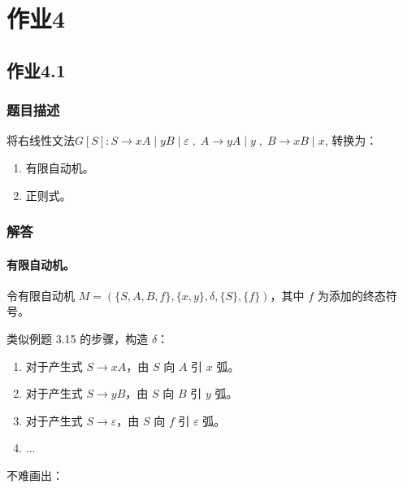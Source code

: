 
\section{作业4}
\subsection{作业4.1}
\subsubsection{题目描述}

将右线性文法$G[S]: S \rightarrow xA\;|\;yB\;|\;\varepsilon\;,\;A \rightarrow yA\;|\;y\;,\;B \rightarrow xB\;|\;x$, 转换为：
\begin{enumerate}
    \item 有限自动机。
    \item 正则式。
\end{enumerate}

\subsubsection{解答}

\paragraph{有限自动机。} 令有限自动机 $M=\left(\{S,A,B,f\},\{x,y\},\delta,\{S\},\{f\}\right)$，其中 $f$ 为添加的终态符号。

类似例题 3.15 的步骤，构造 $\delta$：

\begin{enumerate}
    \item 对于产生式 $S \rightarrow xA$，由 $S$ 向 $A$ 引 $x$ 弧。
    \item 对于产生式 $S \rightarrow yB$，由 $S$ 向 $B$ 引 $y$ 弧。
    \item 对于产生式 $S \rightarrow \varepsilon$，由 $S$ 向 $f$ 引 $\varepsilon$ 弧。
    \item ...
\end{enumerate}

不难画出：

